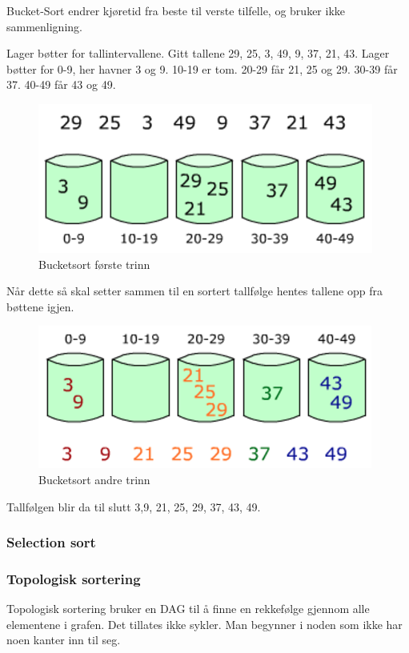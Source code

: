 \noindent Bucket-Sort endrer kjøretid fra beste til verste tilfelle, og bruker ikke sammenligning.

\begin{boxed}
Lager bøtter for tallintervallene. Gitt tallene 29, 25, 3, 49, 9, 37, 21, 43. Lager bøtter for 0-9, her havner 3 og 9. 10-19 er tom. 20-29 får 21, 25 og 29. 30-39 får 37. 40-49 får 43 og 49.

\begin{figure}[H]
\includegraphics[scale=0.5]{images/bucketsort1}
\centering %
\caption{Bucketsort første trinn}
\label{fig:bucketsort1}
\end{figure}

Når dette så skal setter sammen til en sortert tallfølge hentes tallene opp fra bøttene igjen.

\begin{figure}[H]
\includegraphics[scale=0.5]{images/bucketsort2}
\centering %
\caption{Bucketsort andre trinn}
\label{fig:bucketsort2}
\end{figure}

Tallfølgen blir da til slutt 3,9, 21, 25, 29, 37, 43, 49.
\end{boxed}

\subsubsection{Selection sort}

\subsubsection{Topologisk sortering}
Topologisk sortering bruker en DAG til å finne en rekkefølge gjennom alle elementene i grafen. Det tillates ikke sykler. Man begynner i noden som ikke har noen kanter inn til seg.

